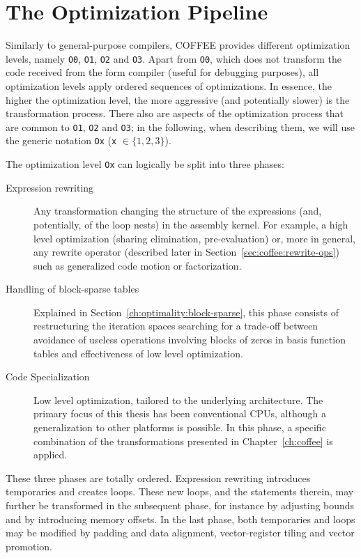 \section{The Optimization Pipeline}
Similarly to general-purpose compilers, COFFEE provides different optimization levels, namely \texttt{O0}, \texttt{O1}, \texttt{O2} and \texttt{O3}. Apart from \texttt{O0}, which does not transform the code received from the form compiler (useful for debugging purposes), all optimization levels apply ordered sequences of optimizations. In essence, the higher the optimization level, the more aggressive (and potentially slower) is the transformation process. There also are aspects of the optimization process that are common to \texttt{O1}, \texttt{O2} and \texttt{O3}; in the following, when describing them, we will use the generic notation \texttt{Ox} (\texttt{x} $\in \lbrace 1, 2, 3\rbrace$).

The optimization level \texttt{Ox} can logically be split into three phases:
\begin{description}
\item[Expression rewriting] Any transformation changing the structure of the expressions (and, potentially, of the loop nests) in the assembly kernel. For example, a high level optimization (sharing elimination, pre-evaluation) or, more in general, any rewrite operator (described later in Section~\ref{sec:coffee:rewrite-ops}) such as generalized code motion or factorization. 
\item[Handling of block-sparse tables] Explained in Section~\ref{ch:optimality:block-sparse}, this phase consists of restructuring the iteration spaces searching for a trade-off between avoidance of useless operations involving blocks of zeros in basis function tables and effectiveness of low level optimization.
\item[Code Specialization] Low level optimization, tailored to the underlying architecture. The primary focus of this thesis has been conventional CPUs, although a generalization to other platforms is possible. In this phase, a specific combination of the transformations presented in Chapter~\ref{ch:coffee} is applied.
\end{description}
These three phases are totally ordered. Expression rewriting introduces temporaries and creates loops. These new loops, and the statements therein, may further be transformed in the subsequent phase, for instance by adjusting bounds and by introducing memory offsets. In the last phase, both temporaries and loops may be modified by padding and data alignment, vector-register tiling and vector promotion.

